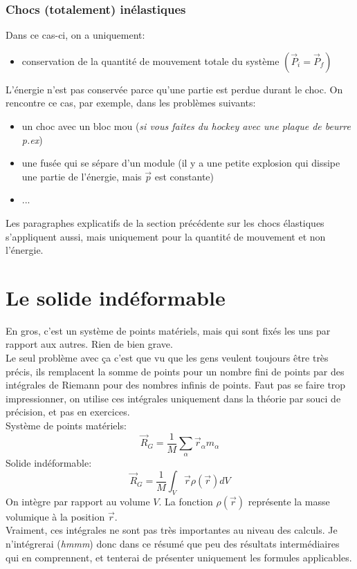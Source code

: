 \documentclass{article}
\numberwithin{equation}{section}
\begin{document}
\subsubsection{Chocs (totalement) inélastiques}
Dans ce cas-ci, on a uniquement:
\begin{itemize}
	\item conservation de la quantité de mouvement totale du système \((\vec P_i = \vec P_f)\)
\end{itemize}
L'énergie n'est pas conservée parce qu'une partie est perdue durant le choc. On rencontre ce cas, par exemple, dans les problèmes suivants:
\begin{itemize}
	\item un choc avec un bloc mou (\emph{si vous faites du hockey avec une plaque de beurre p.ex})
	\item une fusée qui se sépare d'un module (il y a une petite explosion qui dissipe une partie de l'énergie, mais \(\vec p\) est constante)
	\item ...
\end{itemize}
Les paragraphes explicatifs de la section précédente sur les chocs élastiques s'appliquent aussi, mais uniquement pour la quantité de mouvement et non l'énergie.

\section{Le solide indéformable}
En gros, c'est un système de points matériels, mais qui sont fixés les uns par rapport aux autres. Rien de bien grave. \\
Le seul problème avec ça c'est que vu que les gens veulent toujours être très précis, ils remplacent la somme de points pour un nombre fini de points par des intégrales de Riemann pour des nombres infinis de points. Faut pas se faire trop impressionner, on utilise ces intégrales uniquement dans la théorie par souci de précision, et pas en exercices. \\

Système de points matériels:
\begin{equation*}
	\vec R_G = \frac{1}{M} \sum_\alpha \vec r_\alpha m_\alpha
\end{equation*}
Solide indéformable:
\begin{equation*}
	\vec R_G = \frac{1}{M} \int_V \vec r \rho(\vec r) dV
\end{equation*}
On intègre par rapport au volume \(V\). La fonction \(\rho (\vec r)\) représente la masse volumique à la position \(\vec r\). \\
Vraiment, ces intégrales ne sont pas très importantes au niveau des calculs. Je n'intégrerai (\emph{hmmm}) donc dans ce résumé que peu des résultats intermédiaires qui en comprennent, et tenterai de présenter uniquement les formules applicables.

\end{document}
